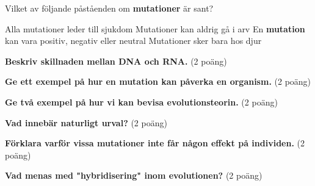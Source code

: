 \documentclass{exam}
\begin{document}
\begin{questions}
\question Vilket av följande påståenden om \textbf{mutationer} är sant?
\begin{checkboxes}
    \choice Alla mutationer leder till sjukdom
    \choice Mutationer kan aldrig gå i arv
    \correctchoice En \textbf{mutation} kan vara positiv, negativ eller neutral
    \choice Mutationer sker bara hos djur
\end{checkboxes}
\vspace{5mm}
\hline

\end{questions}

\break

\vspace{5mm}
\begin{center}
\end{center}
\vspace{5mm}

\begin{questions}

\question \textbf{Beskriv skillnaden mellan DNA och RNA.} (2 poäng)
\vspace{40mm}

\question \textbf{Ge ett exempel på hur en mutation kan påverka en organism.} (2 poäng)
\vspace{40mm}

\question \textbf{Ge två exempel på hur vi kan bevisa evolutionsteorin.} (2 poäng)
\vspace{40mm}

\question \textbf{Vad innebär naturligt urval?} (2 poäng)
\vspace{40mm}

\question \textbf{Förklara varför vissa mutationer inte får någon effekt på individen.} (2 poäng)
\vspace{40mm}

\question \textbf{Vad menas med "hybridisering" inom evolutionen?} (2 poäng)
\vspace{40mm}

\end{questions}
\end{document}
